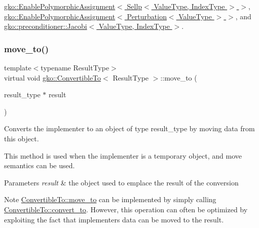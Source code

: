 \hyperlink{classgko_1_1EnablePolymorphicAssignment_a6b7e6872e96084636f8ab5091063ada8}{gko\+::\+Enable\+Polymorphic\+Assignment$<$ Sellp$<$ Value\+Type, Index\+Type $>$ $>$}, \hyperlink{classgko_1_1EnablePolymorphicAssignment_a6b7e6872e96084636f8ab5091063ada8}{gko\+::\+Enable\+Polymorphic\+Assignment$<$ Perturbation$<$ Value\+Type $>$ $>$}, and \hyperlink{classgko_1_1preconditioner_1_1Jacobi_a54ce952ac4a12c3f4686442375cd4dc8}{gko\+::preconditioner\+::\+Jacobi$<$ Value\+Type, Index\+Type $>$}.

\mbox{\label{classgko_1_1ConvertibleTo_ab9047c7c49e0f83c79b54c0034d6197b}} 
\subsubsection{\texorpdfstring{move\+\_\+to()}{move\_to()}}
{\footnotesize\ttfamily template$<$typename Result\+Type$>$ \\
virtual void \hyperlink{classgko_1_1ConvertibleTo}{gko\+::\+Convertible\+To}$<$ Result\+Type $>$\+::move\+\_\+to (\begin{DoxyParamCaption}\item[{result\+\_\+type $\ast$}]{result }\end{DoxyParamCaption})\hspace{0.3cm}{\ttfamily [pure virtual]}}



Converts the implementer to an object of type result\+\_\+type by moving data from this object. 

This method is used when the implementer is a temporary object, and move semantics can be used.


\begin{DoxyParams}{Parameters}
{\em result} & the object used to emplace the result of the conversion\\
\hline
\end{DoxyParams}
\begin{DoxyNote}{Note}
\hyperlink{classgko_1_1ConvertibleTo_ab9047c7c49e0f83c79b54c0034d6197b}{Convertible\+To\+::move\+\_\+to} can be implemented by simply calling \hyperlink{classgko_1_1ConvertibleTo_aa7f3420babcbed39ee15bc020bed4f7e}{Convertible\+To\+::convert\+\_\+to}. However, this operation can often be optimized by exploiting the fact that implementer\textquotesingle{}s data can be moved to the result. 
\end{DoxyNote}



